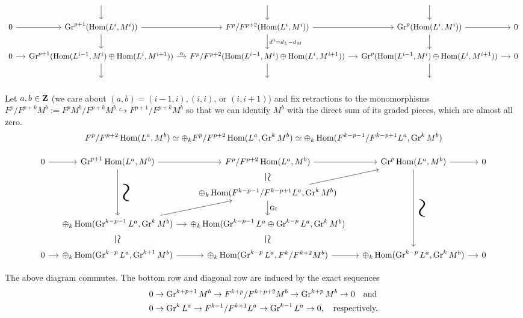 \documentclass[deligne.tex]{subfiles}
\begin{document}
\newpage
{}
\begin{landscape}\begin{small}
\begin{ceqn}\begin{equation*}\begin{tikzcd}[column sep=small]
	&\;\arrow[d]&\;\arrow[d]&\;\arrow[d] \\
	0\arrow[r]
	&\Gr^{p+1}(\Hom(L^i,M^i))\arrow[r]\arrow[d]
	&F^p/F^{p+2}(\Hom(L^i,M^i))\arrow[r]\arrow[d,"d^0=d_L-d_M"]
	&\Gr^p(\Hom(L^i,M^i))\arrow[r]\arrow[d]
	&0 \\
	0\arrow[r]
	&\Gr^{p+1}(\Hom(L^{i-1},M^i)\oplus\Hom(L^i,M^{i+1}))\arrow[r,"\alpha"]\arrow[d]
	&F^p/F^{p+2}(\Hom(L^{i-1},M^i)\oplus\Hom(L^i,M^{i+1}))\arrow[r]\arrow[d]
	&\Gr^p(\Hom(L^{i-1},M^i)\oplus\Hom(L^i,M^{i+1}))\arrow[r]\arrow[d]
	&0\\
	&\;&\;&\;
\end{tikzcd}\end{equation*}
\end{ceqn}\end{small}
Let $a,b\in\mathbf{Z}$ (we care about $(a,b)=(i-1,i),(i,i)$, or $(i,i+1)$)
and fix retractions to the monomorphisms
$F^p/F^{p+k}M^b:=F^pM^b/F^{p+k}M^b\hookrightarrow F^{p+1}/F^{p+k}M^b$
so that we can identify $M^b$ with the direct sum of its graded pieces,
which are almost all zero.
\begin{equation*}
	F^p/F^{p+2}\operatorname{Hom}(L^a,M^b)
	\simeq\oplus_kF^p/F^{p+2}\operatorname{Hom}(L^a,\operatorname{Gr}^kM^b)
	\simeq\oplus_k\operatorname{Hom}(F^{k-p-1}/F^{k-p+1}L^a,\operatorname{Gr}^kM^b)
\end{equation*}
\begin{ceqn}\begin{equation*}\begin{tikzcd}[column sep=small]
	0\arrow[r]&\Gr^{p+1}\Hom(L^a,M^b)\arrow[r]\arrow[dd,"\scalebox{1.5}{\rotatebox{-90}{\text{\Huge$\sim$}}}"]
	&F^p/F^{p+2}\Hom(L^a,M^b)\arrow[r]\arrow[d,phantom,"{\rotatebox{-90}{\text{\Large$\simeq$}}}"]
	&\Gr^p\Hom(L^a,M^b)\arrow[r]\arrow[ddd,"\scalebox{1.5}{\rotatebox{-90}{\text{\Huge$\sim$}}}"]
	&0 \\
	&&\oplus_k\Hom(F^{k-p-1}/F^{k-p+1}L^a,\Gr^kM^b)\arrow[ur]\arrow[d,"\Gr"] \\
	&\oplus_k\Hom(\Gr^{k-p-1}L^a,\Gr^kM^b)\arrow[r]\arrow[ur] \arrow[d,phantom,"{\rotatebox{-90}{\text{\Large$\simeq$}}}"]
	&\oplus_k\Hom(\Gr^{k-p-1}L^a\oplus\Gr^{k-p}L^a,\Gr^kM^b) \arrow[d,phantom,"{\rotatebox{-90}{\text{\Large$\simeq$}}}"] \\
	0\arrow[r]&\oplus_k\Hom(\Gr^{k-p}L^a,\Gr^{k+1}M^b)\arrow[r]
	&\oplus_k\Hom(\Gr^{k-p}L^a,F^k/F^{k+2}M^b)\arrow[r]
	&\oplus_k\Hom(\Gr^{k-p}L^a,\Gr^kM^b)\arrow[r]&0
\end{tikzcd}\end{equation*}\end{ceqn}
The above diagram commutes.
The bottom row and diagonal row are induced by the exact sequences
\begin{align*}
	&0\rightarrow\operatorname{Gr}^{k+p+1}M^b\rightarrow F^{k+p}/F^{k+p+2}M^b\rightarrow\operatorname{Gr}^{k+p}M^b\rightarrow0\quad\text{and} \\
	&0\rightarrow\operatorname{Gr}^kL^a\rightarrow F^{k-1}/F^{k+1}L^a\rightarrow\operatorname{Gr}^{k-1}L^a\rightarrow0,\quad\text{respectively.}
\end{align*}
\end{landscape}
\end{document}
